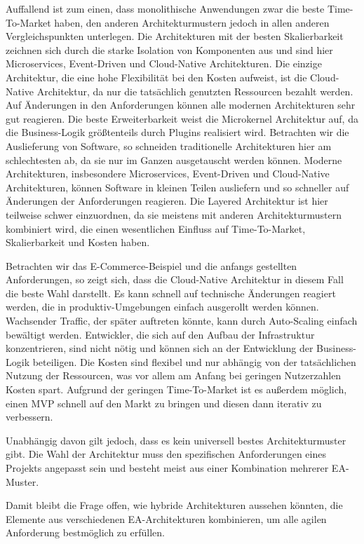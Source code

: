 \documentclass[acmtog]{acmart}
\begin{document}
Auffallend ist zum einen, dass monolithische Anwendungen zwar die beste Time-To-Market haben, den anderen Architekturmustern jedoch in allen anderen Vergleichspunkten unterlegen.
Die Architekturen mit der besten Skalierbarkeit zeichnen sich durch die starke Isolation von Komponenten aus und sind hier Microservices, Event-Driven und Cloud-Native Architekturen.
Die einzige Architektur, die eine hohe Flexibilität bei den Kosten aufweist, ist die Cloud-Native Architektur, da nur die tatsächlich genutzten Ressourcen bezahlt werden.
Auf Änderungen in den Anforderungen können alle modernen Architekturen sehr gut reagieren.
Die beste Erweiterbarkeit weist die Microkernel Architektur auf, da die Business-Logik größtenteils durch Plugins realisiert wird.
Betrachten wir die Auslieferung von Software, so schneiden traditionelle Architekturen hier am schlechtesten ab, da sie nur im Ganzen ausgetauscht werden können.
Moderne Architekturen, insbesondere Microservices, Event-Driven und Cloud-Native Architekturen, können Software in kleinen Teilen ausliefern und so schneller auf Änderungen der Anforderungen reagieren.
Die Layered Architektur ist hier teilweise schwer einzuordnen, da sie meistens mit anderen Architekturmustern kombiniert wird, die einen wesentlichen Einfluss auf Time-To-Market, Skalierbarkeit und Kosten haben.

Betrachten wir das E-Commerce-Beispiel und die anfangs gestellten Anforderungen, so zeigt sich, dass die Cloud-Native Architektur in diesem Fall die beste Wahl darstellt.
Es kann schnell auf technische Änderungen reagiert werden, die in produktiv-Umgebungen einfach ausgerollt werden können.
Wachsender Traffic, der später auftreten könnte, kann durch Auto-Scaling einfach bewältigt werden.
Entwickler, die sich auf den Aufbau der Infrastruktur konzentrieren, sind nicht nötig und können sich an der Entwicklung der Business-Logik beteiligen.
Die Kosten sind flexibel und nur abhängig von der tatsächlichen Nutzung der Ressourcen, was vor allem am Anfang bei geringen Nutzerzahlen Kosten spart.
Aufgrund der geringen Time-To-Market ist es außerdem möglich, einen MVP schnell auf den Markt zu bringen und diesen dann iterativ zu verbessern.

Unabhängig davon gilt jedoch, dass es kein universell bestes Architekturmuster gibt.
Die Wahl der Architektur muss den spezifischen Anforderungen eines Projekts angepasst sein und besteht meist aus einer Kombination mehrerer EA-Muster.

Damit bleibt die Frage offen, wie hybride Architekturen aussehen könnten, die Elemente aus verschiedenen EA-Architekturen kombinieren, um alle agilen Anforderung bestmöglich zu erfüllen.
\end{document}
